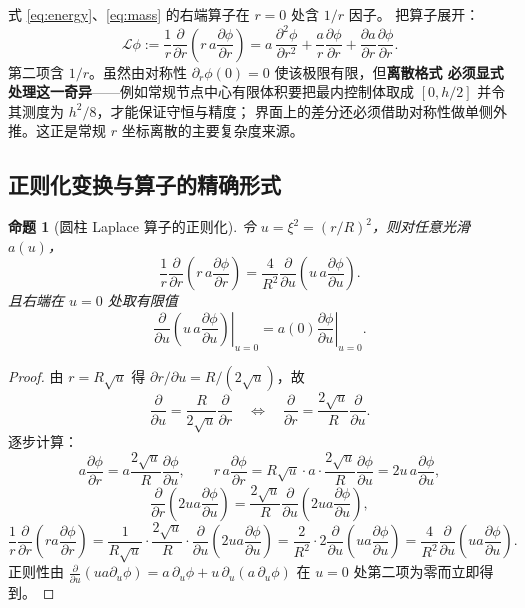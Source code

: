 \documentclass[11pt,a4paper]{article}
\newtheorem{proposition}{命题}
\theoremstyle{definition}
\begin{document}
式 \eqref{eq:energy}、\eqref{eq:mass} 的右端算子在 $r=0$ 处含 $1/r$ 因子。
把算子展开：
\[
\mathcal{L}\phi:=\frac{1}{r}\frac{\partial}{\partial r}\!\left(r\,a\frac{\partial \phi}{\partial r}\right)
=a\,\frac{\partial^2\phi}{\partial r^2}+\frac{a}{r}\frac{\partial \phi}{\partial r}
+\frac{\partial a}{\partial r}\frac{\partial \phi}{\partial r}.
\]
第二项含 $1/r$。虽然由对称性 $\partial_r\phi(0)=0$ 使该极限有限，但\textbf{离散格式
必须显式处理这一奇异}——例如常规节点中心有限体积要把最内控制体取成
$[0,h/2]$ 并令其测度为 $h^2/8$，才能保证守恒与精度；
界面上的差分还必须借助对称性做单侧外推。这正是常规 $r$ 坐标离散的主要复杂度来源。

\subsection{正则化变换与算子的精确形式}

\begin{proposition}[圆柱 Laplace 算子的正则化]
令 $u=\xi^2=(r/R)^2$，则对任意光滑 $a(u)$，
\begin{equation}
\frac{1}{r}\frac{\partial}{\partial r}\!\left(r\,a\frac{\partial \phi}{\partial r}\right)
=\frac{4}{R^2}\frac{\partial}{\partial u}\!\left(u\,a\frac{\partial \phi}{\partial u}\right).
\label{eq:regularize}
\end{equation}
且右端在 $u=0$ 处取有限值
\[
\left.\frac{\partial}{\partial u}\!\left(u\,a\frac{\partial \phi}{\partial u}\right)\right|_{u=0}
=a(0)\left.\frac{\partial \phi}{\partial u}\right|_{u=0}.
\]
\end{proposition}

\begin{proof}
由 $r=R\sqrt{u}$ 得 $\partial r/\partial u=R/(2\sqrt u)$，故
\[
\frac{\partial}{\partial u}=\frac{R}{2\sqrt u}\frac{\partial}{\partial r}
\quad\Longleftrightarrow\quad
\frac{\partial}{\partial r}=\frac{2\sqrt u}{R}\frac{\partial}{\partial u}.
\]
逐步计算：
\[
a\frac{\partial \phi}{\partial r}=a\frac{2\sqrt u}{R}\frac{\partial \phi}{\partial u},
\qquad
r\,a\frac{\partial \phi}{\partial r}=R\sqrt u\cdot a\cdot\frac{2\sqrt u}{R}\frac{\partial \phi}{\partial u}
=2u\,a\frac{\partial \phi}{\partial u},
\]
\[
\frac{\partial}{\partial r}\!\left(2ua\frac{\partial \phi}{\partial u}\right)
=\frac{2\sqrt u}{R}\frac{\partial}{\partial u}\!\left(2ua\frac{\partial \phi}{\partial u}\right),
\]
\[
\frac{1}{r}\frac{\partial}{\partial r}\!\left(r a\frac{\partial \phi}{\partial r}\right)
=\frac{1}{R\sqrt u}\cdot\frac{2\sqrt u}{R}\cdot
\frac{\partial}{\partial u}\!\left(2ua\frac{\partial \phi}{\partial u}\right)
=\frac{2}{R^2}\cdot 2\frac{\partial}{\partial u}\!\left(ua\frac{\partial \phi}{\partial u}\right)
=\frac{4}{R^2}\frac{\partial}{\partial u}\!\left(ua\frac{\partial \phi}{\partial u}\right).
\]
正则性由
$\frac{\partial}{\partial u}(ua\partial_u\phi)=a\,\partial_u\phi+u\,\partial_u(a\,\partial_u\phi)$
在 $u=0$ 处第二项为零而立即得到。
\end{proof}
\end{document}
